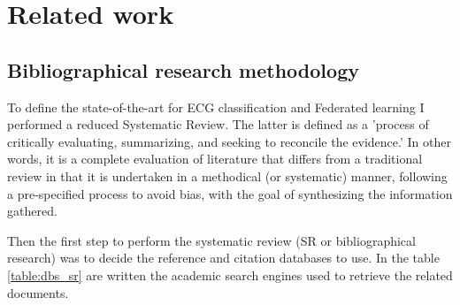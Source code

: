 \chapter{Related work} \label{chap3}

\section{Bibliographical research methodology} \label{3biblio_research}

To define the state-of-the-art for ECG classification and Federated learning I performed a reduced Systematic Review. The latter is defined as \cite{systematic_review} a 'process of critically evaluating, summarizing, and seeking to reconcile the evidence.' In other words, it is a complete evaluation of literature that differs from a traditional review in that it is undertaken in a methodical (or systematic) manner, following a pre-specified process to avoid bias, with the goal of synthesizing the information gathered. 

Then the first step to perform the systematic review (SR or bibliographical research) was to decide the reference and citation databases to use. In the table \ref{table:dbs_sr} are written the academic search engines used to retrieve the related documents.

